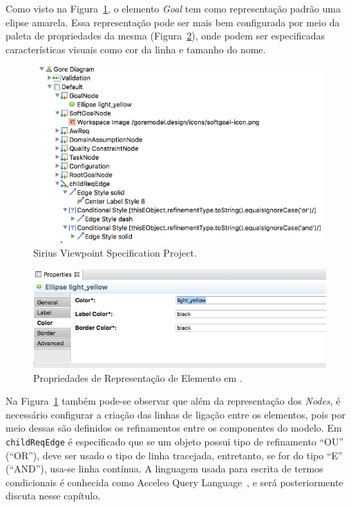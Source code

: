 Como visto na Figura~\ref{exemplo-sirius-vsp}, o elemento \textit{Goal} tem como representação padrão uma elipse amarela. Essa representação pode ser mais bem configurada por meio da paleta de propriedades da mesma (Figura~\ref{figura-propriedades-personalizacao}), onde podem ser especificadas características visuais como cor da linha e tamanho do nome.

\begin{figure}
	\centering
	\includegraphics[width=1\textwidth]{figuras/unagi/exemplo-sirius-vsp.png}
	\caption{Sirius Viewpoint Specification Project.}
	\label{exemplo-sirius-vsp}
\end{figure}

\begin{figure}
	\centering
	\includegraphics[width=1\textwidth]{figuras/unagi/exemplo-propriedades-personalizacao.png}
	\caption{Propriedades de Representação de Elemento em \sirius.}
	\label{figura-propriedades-personalizacao}
\end{figure}

Na Figura~\ref{exemplo-sirius-vsp} também pode-se observar que além da representação dos \textit{Nodes}, é necessário configurar a criação das linhas de ligação entre os elementos, pois por meio dessas são definidos os refinamentos entre os componentes do modelo. Em \texttt{childReqEdge} é especificado que se um objeto possui tipo de refinamento ``OU'' (``OR''), deve ser usado o tipo de linha tracejada, entretanto, se for do tipo ``E'' (``AND''), usa-se linha contínua. A linguagem usada para escrita de termos condicionais é conhecida como Acceleo Query Language~\cite{musset2006acceleo}, e será posteriormente discuta nesse capítulo.

